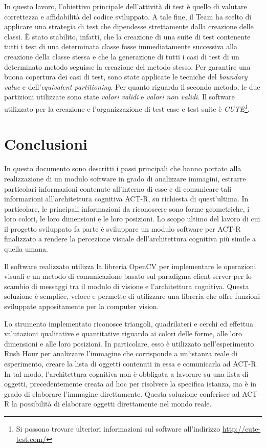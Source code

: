 		In questo lavoro, l'obiettivo principale dell'attività di test è quello di valutare correttezza e affidabilità del codice sviluppato.
		A tale fine, il Team ha scelto di applicare una strategia di test che dipendesse strettamente dalla creazione delle classi.
		È stato stabilito, infatti, che la creazione di una suite di test contenente tutti i test di una determinata classe fosse immediatamente successiva alla creazione della classe stessa e che la generazione di tutti i casi di test di un determinato metodo seguisse la creazione del metodo stesso.
		Per garantire una buona copertura dei casi di test, sono state applicate le tecniche del \emph{boundary value} e dell'\emph{equivalent partitioning}.
		Per quanto riguarda il secondo metodo, le due partizioni utilizzate sono state \emph{valori validi} e \emph{valori non validi}.
		Il software utilizzato per la creazione e l'organizzazione di test case e test suite è \emph{CUTE\footnote{Si possono trovare ulteriori informazioni sul software all'indirizzo \url{http://cute-test.com/}}}.
		

	\section*{Conclusioni}
		In questo documento sono descritti i passi principali che hanno portato alla realizzazione di un modulo software in grado di analizzare immagini, estrarre particolari informazioni contenute all'interno di esse e di comunicare tali informazioni all'architettura cognitiva \mbox{ACT-R}, su richiesta di quest'ultima.
		In particolare, le principali informazioni da riconoscere sono	forme geometriche, i loro colori, le loro dimensioni e le loro posizioni.
		Lo scopo ultimo del lavoro di cui il progetto sviluppato fa parte è sviluppare un modulo software per \mbox{ACT-R} finalizzato a rendere la percezione visuale dell'architettura cognitiva più simile a quella umana.

		Il software realizzato utilizza la libreria \mbox{OpenCV} per implementare le operazioni visuali e un metodo di comunicazione basato sul paradigma client-server per lo scambio di messaggi tra il modulo di visione e l'architettura cognitiva. 
		Questa soluzione è semplice, veloce e permette di utilizzare una libreria che offre funzioni sviluppate appositamente per la computer vision.

		Lo strumento implementato riconosce triangoli, quadrilateri e cerchi ed effettua valutazioni qualitative e quantitative riguardo ai colori delle forme, alle loro dimensioni e alle loro posizioni.
		In particolare, esso è utilizzato nell'esperimento Rush Hour per analizzare l'immagine che corrisponde a un'istanza reale di esperimento, creare la lista di oggetti contenuti in essa e comunicarla ad \mbox{ACT-R}.
		In tal modo, l'architettura cognitiva non è obbligata a lavorare su una lista di oggetti, precedentemente creata ad hoc per risolvere la specifica istanza, ma è in grado di elaborare l'immagine direttamente. 
		Questa soluzione conferisce ad \mbox{ACT-R} la possibilità di elaborare oggetti direttamente nel mondo reale.

